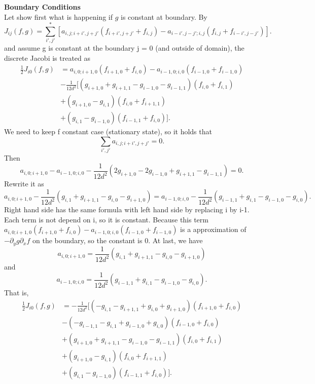 \noindent
\textbf{Boundary Conditions}\\
Let show first what is happening if $g$ is constant at boundary. By
\begin{equation}
    J_{ij}(f,g)=\sum^*_{i',j'}[a_{i,j;i+i',j+j'}(f_{i+i',j+j'}+f_{i,j})-a_{i-i',j-j';i,j}(f_{i,j}+f_{i-i',j-j'})].
\end{equation}
and assume g is constant at the boundary j = 0 (and outside of domain), the discrete Jacobi is treated as
\begin{equation}
\begin{aligned}
\frac{1}{2}J_{i0} (f,g) &= a_{i,0;i+1,0}(f_{i+1,0}+f_{i,0})-a_{i-1,0;i,0}(f_{i-1,0}+f_{i-1,0})\\
&-\frac{1}{12d^2}[(g_{i+1,0}+g_{i+1,1}-g_{i-1,0}-g_{i-1,1})(f_{i,0}+f_{i,1})\\
&+(g_{i+1,0}-g_{i,1})(f_{i,0}+f_{i+1,1})\\
&+(g_{i,1}-g_{i-1,0})(f_{i-1,1}+f_{i,0})].
\end{aligned}
\end{equation}
We need to keep f constant case (stationary state), so it holds that $$\sum_{i',j'} a_{i,j;i+i',j+j'}=0.$$ 
Then 
$$a_{i,0;i+1,0}-a_{i-1,0;i,0}-\frac{1}{12d^2}(2g_{i+1,0}-2g_{i-1,0}+g_{i+1,1}-g_{i-1,1})=0.$$
Rewrite it as 
$$a_{i,0;i+1,0}-\frac{1}{12d^2}(g_{i,1}+g_{i+1,1}-g_{i,0}-g_{i+1,0})=a_{i-1,0;i,0}-\frac{1}{12d^2}(g_{i-1,1}+g_{i,1}-g_{i-1,0}-g_{i,0}).$$
Right hand side has the same formula with left hand side by replacing i by i-1. Each term is not depend on i, so it is constant. Because this term $a_{i,0;i+1,0}(f_{i+1,0}+f_{i,0})-a_{i-1,0;i,0}(f_{i-1,0}+f_{i-1,0})$ is a approximation of $-\partial_y g \partial_x f$ on the boundary, so the constant is 0.
At last, we have $$a_{i,0;i+1,0}=\frac{1}{12d^2}(g_{i,1}+g_{i+1,1}-g_{i,0}-g_{i+1,0})$$ and $$a_{i-1,0;i,0}=\frac{1}{12d^2}(g_{i-1,1}+g_{i,1}-g_{i-1,0}-g_{i,0}).$$ 
That is,
\begin{equation}
\begin{aligned}
\frac{1}{2}J_{i0} (f,g) &=-\frac{1}{12d^2}[(-g_{i,1}-g_{i+1,1}+g_{i,0}+g_{i+1,0})(f_{i+1,0}+f_{i,0})\\
&-(-g_{i-1,1}-g_{i,1}+g_{i-1,0}+g_{i,0})(f_{i-1,0}+f_{i,0})\\
&+(g_{i+1,0}+g_{i+1,1}-g_{i-1,0}-g_{i-1,1})(f_{i,0}+f_{i,1})\\
&+(g_{i+1,0}-g_{i,1})(f_{i,0}+f_{i+1,1})\\
&+(g_{i,1}-g_{i-1,0})(f_{i-1,1}+f_{i,0})].
\end{aligned}
\end{equation}
